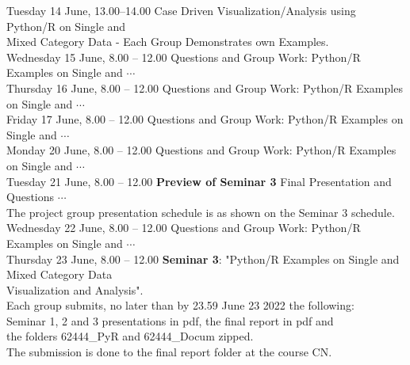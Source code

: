 \documentclass{beamer}
\begin{document}
\begin{frame}[fragile]
{\begin{tabbing}
  Tuesday 14 June, 13.00--14.00  \> Case Driven Visualization/Analysis using Python/R on Single and \\
                                 \>   Mixed Category Data - Each Group Demonstrates own Examples.\\
  Wednesday 15 June, 8.00 -- 12.00 \> Questions and  Group Work: Python/R Examples on Single and $\cdots$ \\
  Thursday 16 June, 8.00 -- 12.00  \> Questions and Group Work: Python/R Examples on Single and $\cdots$ \\
  Friday 17 June, 8.00 -- 12.00    \> Questions and Group Work: Python/R Examples on Single and $\cdots$ \\
  Monday 20 June, 8.00 -- 12.00    \> Questions and Group Work: Python/R Examples on Single and $\cdots$ \\
  Tuesday 21 June, 8.00 -- 12.00 \> {\bf  Preview of Seminar 3} Final Presentation and Questions $\cdots$\\
                                              \> The project group presentation schedule is as shown on the Seminar 3 schedule.\\
  Wednesday 22 June, 8.00 -- 12.00 \> Questions and  Group Work: Python/R Examples on Single and $\cdots$ \\
  Thursday 23 June, 8.00 -- 12.00  \> {\bf Seminar 3}: "Python/R Examples on Single and Mixed Category Data\\
                                   \>  Visualization and Analysis".\\
                                   \>  Each group submits, no later than by 23.59 June 23 2022 the following:\\
                                   \>  Seminar 1, 2 and 3 presentations in pdf, the final report in pdf and\\
                                   \>  the folders 62444\_PyR and 62444\_Docum zipped.\\
                                   \>  The submission is done to the final report folder at the course CN.\\
\end{tabbing}

}
\end{frame}

%
%
\end{document}
